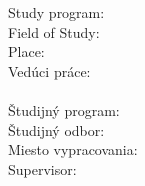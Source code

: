 \vspace*{4cm}
{
	Study program: \Program\\
	Field of Study: \Field\\
	Place: \Place\\
	Vedúci práce: \Supervisor \\\\
}
{
	Študijný program: \Program\\
	Študijný odbor: \Field\\
	Miesto vypracovania: \Place\\
	Supervisor: \Supervisor \\\\
}
\Month \Year
